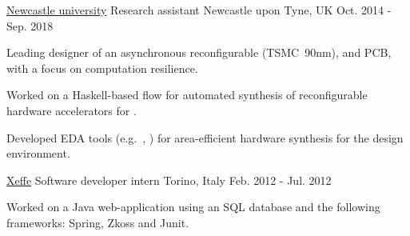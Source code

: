 
\begin{cventries}


\cventry
{\href{https://www.ncl.ac.uk/}{\color{myblue}Newcastle university}}
{Research assistant} %
{Newcastle upon Tyne, UK} %
{Oct. 2014 - Sep. 2018} %
{ 
\begin{cvitems}
\item {Leading designer of an asynchronous reconfigurable
	\href{https://ieeexplore.ieee.org/document/8342264/}{}
	(TSMC~90nm), and PCB, with a focus on computation resilience.}
\item {Worked on a Haskell-based flow for automated synthesis of 
	reconfigurable hardware accelerators for 	
	\href{https://github.com/tuura/fantasi/tree/master/doc}{}.}
\item {Developed EDA tools 
	(e.g.~\href{https://github.com/tuura/shutters}{},
	\href{https://github.com/tuura/scenco}{})
	for area-efficient hardware synthesis for the
	\href{https://workcraft.org/}{}
	design environment.}
\end{cvitems}
}


\cventry
{\color{myblue}\href{http://www.xeffe.it/}{Xeffe}}
{Software developer intern}
{Torino, Italy}
{Feb. 2012 - Jul. 2012}
{
\begin{cvitems}
Worked on a Java web-application using an SQL database and 
the following frameworks: Spring, Zkoss and Junit.
\end{cvitems}
}


\end{cventries}